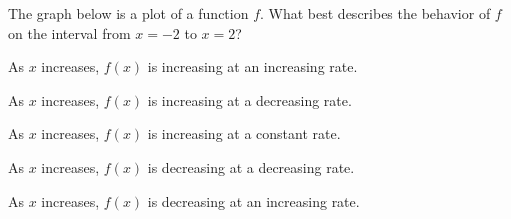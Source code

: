\documentclass[12pt]{ximera}
\renewenvironment{multipleChoice}
{\begin{trivlist}\item[\hskip\labelsep\small\bfseries Choose the best answer:]
\hfil\begin{enumerate}\begin{multicols}{2}}
 {\end{multicols}\end{enumerate}\end{trivlist}}
\renewcommand{\choice}[2][]{\item \begin{minipage}[t]{2in}#2\end{minipage}\ifthenelse{\boolean{#1}}{\ifhandout \else  \fi}{}}
\begin{document}
\begin{minipage}{\textwidth}
\begin{problem}
  The graph below is a plot of a function $f$.  What best describes
  the behavior of $f$ on the interval from $x=-2$ to $x=2$?
  \begin{image}
    \end{image}
  \begin{multipleChoice}
    \choice{As $x$ increases, $f(x)$ is increasing at an increasing rate.}
    \choice[correct]{As $x$ increases, $f(x)$ is increasing at a decreasing rate.}
    \choice{As $x$ increases, $f(x)$ is increasing at a constant rate.}
    \choice{As $x$ increases, $f(x)$ is decreasing at a decreasing rate.}
    \choice{As $x$ increases, $f(x)$ is decreasing at an increasing rate.}
  \end{multipleChoice}
\end{problem}
\end{minipage}

\vspace{6ex}
\end{document}
